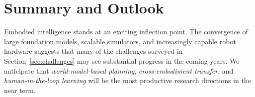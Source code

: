 \documentclass[12pt, a4paper]{article}
\begin{document}
\section{Summary and Outlook}
\label{sec:outlook}


Embodied intelligence stands at an exciting inflection point.
The convergence of large foundation models, scalable simulators,
and increasingly capable robot hardware suggests that many of the
challenges surveyed in Section~\ref{sec:challenges} may see
substantial progress in the coming years.
We anticipate that \emph{world-model-based planning},
\emph{cross-embodiment transfer}, and
\emph{human-in-the-loop learning} will be the most productive
research directions in the near term.


\end{document}
